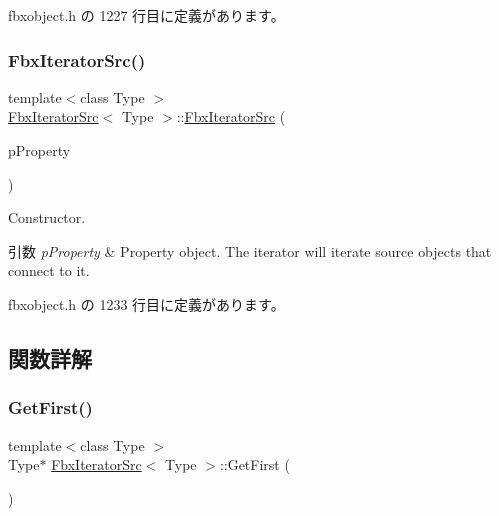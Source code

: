  fbxobject.\+h の 1227 行目に定義があります。

\mbox{\label{class_fbx_iterator_src_a5982990c1de3efa6145b49ffcf129d39}} 
\subsubsection{\texorpdfstring{Fbx\+Iterator\+Src()}{FbxIteratorSrc()}\hspace{0.1cm}{\footnotesize\ttfamily [2/2]}}
{\footnotesize\ttfamily template$<$class Type $>$ \\
\hyperlink{class_fbx_iterator_src}{Fbx\+Iterator\+Src}$<$ Type $>$\+::\hyperlink{class_fbx_iterator_src}{Fbx\+Iterator\+Src} (\begin{DoxyParamCaption}\item[{\hyperlink{class_fbx_property}{Fbx\+Property} \&}]{p\+Property }\end{DoxyParamCaption})\hspace{0.3cm}{\ttfamily [inline]}}

Constructor. 
\begin{DoxyParams}{引数}
{\em p\+Property} & Property object. The iterator will iterate source objects that connect to it. \\
\hline
\end{DoxyParams}


 fbxobject.\+h の 1233 行目に定義があります。



\subsection{関数詳解}
\mbox{\label{class_fbx_iterator_src_aef5d6205bcb4f41501f5a1ec1765182c}} 
\subsubsection{\texorpdfstring{Get\+First()}{GetFirst()}}
{\footnotesize\ttfamily template$<$class Type $>$ \\
Type$\ast$ \hyperlink{class_fbx_iterator_src}{Fbx\+Iterator\+Src}$<$ Type $>$\+::Get\+First (\begin{DoxyParamCaption}{ }\end{DoxyParamCaption})\hspace{0.3cm}{\ttfamily [inline]}}

